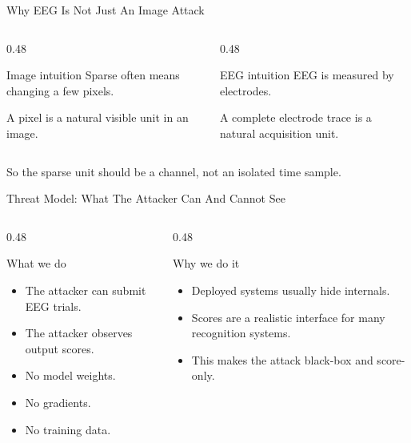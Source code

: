 \documentclass[aspectratio=169,11pt]{beamer}
\newcommand{\whatwhy}[2]{%
\begin{columns}[T,onlytextwidth]
  \begin{column}{0.48\textwidth}
    \begin{block}{What we do}
      #1
    \end{block}
  \end{column}
  \begin{column}{0.48\textwidth}
    \begin{block}{Why we do it}
      #2
    \end{block}
  \end{column}
\end{columns}
}
\newcommand{\smallgap}{\vspace{0.45em}}
\begin{document}
\begin{frame}{Why EEG Is Not Just An Image Attack}
\begin{columns}[T,onlytextwidth]
  \begin{column}{0.48\textwidth}
    \begin{block}{Image intuition}
      Sparse often means changing a few pixels.

      \smallgap
      A pixel is a natural visible unit in an image.
    \end{block}
  \end{column}
  \begin{column}{0.48\textwidth}
    \begin{block}{EEG intuition}
      EEG is measured by electrodes.

      \smallgap
      A complete electrode trace is a natural acquisition unit.
    \end{block}
  \end{column}
\end{columns}

\smallgap
\begin{center}
\alert{So the sparse unit should be a channel, not an isolated time sample.}
\end{center}
\end{frame}

\begin{frame}{Threat Model: What The Attacker Can And Cannot See}
\whatwhy{
\begin{itemize}
  \item The attacker can submit EEG trials.
  \item The attacker observes output scores.
  \item No model weights.
  \item No gradients.
  \item No training data.
\end{itemize}
}{
\begin{itemize}
  \item Deployed systems usually hide internals.
  \item Scores are a realistic interface for many recognition systems.
  \item This makes the attack black-box and score-only.
\end{itemize}
}
\end{frame}
\end{document}
